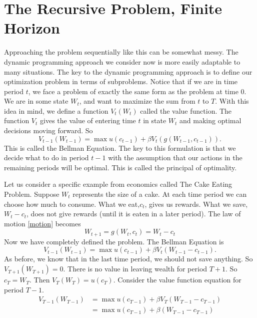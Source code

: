 \section*{The Recursive Problem, Finite Horizon}
Approaching the problem sequentially like this can be somewhat messy.  The dynamic programming approach we consider now is more easily adaptable to many situations.  The key to the dynamic programming approach is to define our optimization problem in terms of subproblems.  Notice that if we are in time period $t$, we face a problem of exactly the same form as the problem at time $0$.  We are in some state $W_t$, and want to maximize the sum from $t$ to $T$.  With this idea in mind, we define a function $V_t(W_t)$ called the value function.  The function $V_t$ gives the value of entering time $t$ in state $W_t$ and making optimal decisions moving forward.  So
\begin{equation*}
V_{t-1}(W_{t-1}) = \max u(c_{t-1}) + \beta V_t(g(W_{t-1},c_{t-1})).
\end{equation*}
This is called the Bellman Equation.  The key to this formulation is that we decide what to do in period $t-1$ with the assumption that our actions in the remaining periods will be optimal.  This is called the principal of optimality.

Let us consider a specific example from economics called The Cake Eating Problem.  Suppose $W_t$ represents the size of a cake.  At each time period we can choose how much to consume.  What we eat,$c_t$, gives us rewards.  What we save,$W_t-c_t$, does not give rewards (until it is eaten in a later period).  The law of motion \eqref{motion} becomes
\begin{equation}\label{LOM_EX}
W_{t+1} = g(W_t,c_t) = W_t-c_t
\end{equation}
Now we have completely defined the problem.  The Bellman Equation is
\begin{equation*}
V_{t-1}(W_{t-1}) = \max u(c_{t-1}) + \beta V_t(W_{t-1}-c_{t-1}).
\end{equation*}
As before, we know that in the last time period, we should not save anything.  So $V_{T+1}(W_{T+1}) = 0$.  There is no value in leaving wealth for period $T+1$.  So $c_T = W_T$.  Then $V_T(W_T) = u(c_T)$.  Consider the value function equation for period $T-1$.
\begin{align*}
V_{T-1}(W_{T-1}) &= \max u(c_{T-1}) + \beta V_T(W_{T-1}-c_{T-1}) \\
                 &= \max u(c_{T-1}) + \beta (W_{T-1}-c_{T-1})
\end{align*}

